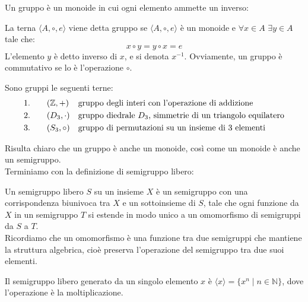\documentclass{article}
\begin{document}
\noindent Un gruppo è un monoide in cui ogni elemento ammette un inverso:
\\\noindent
\begin{definition} 
La terna $\langle A, \circ, e \rangle$ viene detta gruppo se $\langle A, \circ, e \rangle$ è un monoide e $\forall$$x \in A$ $\exists$$y \in A$ tale che:
\[ x \circ y = y \circ x = e \]
L’elemento $y$ è detto inverso di $x$, e si denota $x^{-1}$.
Ovviamente, un gruppo è commutativo se lo è l’operazione $\circ$.
\end{definition}
\begin{example} Sono gruppi le seguenti terne:
\begin{align*} 
    &\text{1.} \quad && (\mathbb{Z}, +) && \text{gruppo degli interi con l'operazione di addizione} \\
    &\text{2.} \quad && (D_3, \cdot) && \text{gruppo diedrale \( D_3 \), simmetrie di un triangolo equilatero} \\
    &\text{3.} \quad && (S_3, \circ) && \text{gruppo di permutazioni su un insieme di 3 elementi }
\end{align*}
\end{example}
\noindent Risulta chiaro che un gruppo è anche un monoide, così come un monoide è anche un semigruppo.
\\Terminiamo con la definizione di semigruppo libero:
\begin{definition} 
Un semigruppo libero \( S \) su un insieme \( X \) è un semigruppo con una corrispondenza biunivoca tra \( X \) e un sottoinsieme di \( S \), tale che ogni funzione da \( X \) in un semigruppo \( T \) si estende in modo unico a un omomorfismo di semigruppi da \( S \) a \( T \).
\\Ricordiamo che un omomorfismo è una funzione tra due semigruppi che mantiene la struttura algebrica, cioè preserva l'operazione del semigruppo tra due suoi elementi.
\end{definition}
\begin{example}
Il semigruppo libero generato da un singolo elemento \( x \) è \( \langle x \rangle = \{ x^n \mid n \in \mathbb{N} \} \), dove l'operazione è la moltiplicazione.
\end{example}
\end{document}
